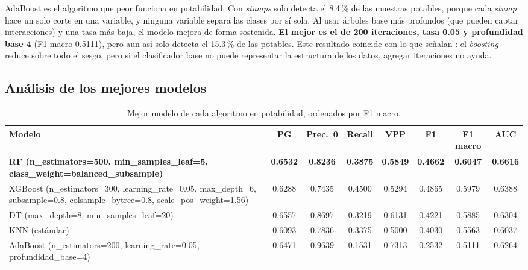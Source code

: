 \documentclass[11pt,a4paper]{article}
\let\citetOriginal\citet
\renewcommand*{\citet}[1]{\textbf{\citetOriginal{#1}}}%
\begin{document}
AdaBoost es el algoritmo que peor funciona en potabilidad. Con \textit{stumps} solo detecta el 8.4\,\% de las muestras potables, porque cada \textit{stump} hace un solo corte en una variable, y ninguna variable separa las clases por sí sola. Al usar árboles base más profundos (que pueden captar interacciones) y una tasa más baja, el modelo mejora de forma sostenida. \textbf{El mejor es el de 200 iteraciones, tasa 0.05 y profundidad base 4} (F1 macro 0.5111), pero aun así solo detecta el 15.3\,\% de las potables. Este resultado coincide con lo que señalan \citet{hastie2009}: el \textit{boosting} reduce sobre todo el sesgo, pero si el clasificador base no puede representar la estructura de los datos, agregar iteraciones no ayuda.

\subsection{Análisis de los mejores modelos}

\begin{table}[H]
\centering
\small
\caption{Mejor modelo de cada algoritmo en potabilidad, ordenados por F1 macro.}
\setlength{\tabcolsep}{4pt}
\begin{tabular}{>{\raggedright\arraybackslash}p{4.9cm}ccccccc}
\toprule
Modelo & PG & Prec.\ 0 & Recall & VPP & F1 & F1 macro & AUC \\
\midrule
\textbf{RF (n\_estimators=\allowbreak{}500, \allowbreak min\_samples\_leaf=\allowbreak{}5, \allowbreak class\_weight=\allowbreak{}balanced\_subsample)} & \textbf{0.6532} & \textbf{0.8236} & \textbf{0.3875} & \textbf{0.5849} & \textbf{0.4662} & \textbf{0.6047} & \textbf{0.6616} \\
XGBoost (n\_estimators=\allowbreak{}300, \allowbreak learning\_rate=\allowbreak{}0.05, \allowbreak max\_depth=\allowbreak{}6, \allowbreak subsample=\allowbreak{}0.8, \allowbreak colsample\_bytree=\allowbreak{}0.8, \allowbreak scale\_pos\_weight=\allowbreak{}1.56) & 0.6288 & 0.7435 & 0.4500 & 0.5294 & 0.4865 & 0.5979 & 0.6388 \\
DT (max\_depth=\allowbreak{}8, \allowbreak min\_samples\_leaf=\allowbreak{}20) & 0.6557 & 0.8697 & 0.3219 & 0.6131 & 0.4221 & 0.5885 & 0.6304 \\
KNN (estándar) & 0.6093 & 0.7836 & 0.3375 & 0.5000 & 0.4030 & 0.5563 & 0.6037 \\
AdaBoost (n\_estimators=\allowbreak{}200, \allowbreak learning\_rate=\allowbreak{}0.05, \allowbreak profundidad\_base=\allowbreak{}4) & 0.6471 & 0.9639 & 0.1531 & 0.7313 & 0.2532 & 0.5111 & 0.6264 \\
\bottomrule
\end{tabular}
\end{table}
\end{document}
